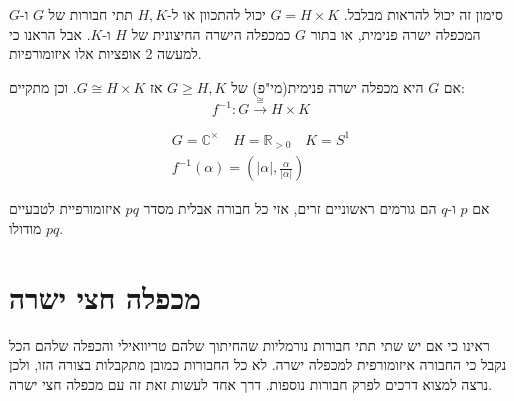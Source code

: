 \documentclass{tstextbook}
\begin{document}
\begin{remark}
סימון זה יכול להראות מבלבל. \(G=H\times K\) יכול להתכוון או ל-\(H,K\) תתי חבורות של \(G\) ו-\(G\) המכפלה ישרה פנימית, או בתור \(G\) כמכפלה הישרה החיצונית של \(H\) ו-\(K\). אבל הראנו כי למעשה 2 אופציות אלו איזומורפיות.

\end{remark}
\begin{corollary}
אם \(G\) היא מכפלה ישרה פנימית(מי"פ) של \(G\geq H,K\) אז \(G\cong H\times K\). וכן מתקיים:
$$f^{-1} :G\xrightarrow{\cong}H\times K$$

\end{corollary}
\begin{example}
$$\begin{gathered}G=\mathbb{C} ^\times \quad H=\mathbb{R} _{>0}\quad K=S^1 \\f^{-1} \left( \alpha \right)=\left( |\alpha|, \frac{\alpha}{|\alpha|} \right)
\end{gathered}$$

\end{example}
\begin{proposition}
אם \(p\) ו-\(q\) הם גורמים ראשוניים זרים, אזי כל חבורה אבלית מסדר \(pq\) איזומורפיית לטבעיים מודולו \(pq\).

\end{proposition}
\section{מכפלה חצי ישרה}

ראינו כי אם יש שתי תתי חבורות נורמליות שהחיתוך שלהם טריוואילי והכפלה שלהם הכל נקבל כי החבורה איזומורפית למכפלה ישרה. לא כל החבורות כמובן מתקבלות בצורה הזו, ולכן נרצה למצוא דרכים לפרק חבורות נוספות. דרך אחד לעשות זאת זה עם מכפלה חצי ישרה.
\end{document}
